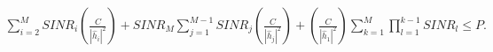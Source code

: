 \documentclass[preview]{standalone}
\begin{document}
\begin{align*}
\sum_{i=2}^{M} SINR_i \left( \frac{C}{\left|{\hat{h}_i}\right|^2} \right) + SINR_M \sum_{j=1}^{M-1} SINR_j \left( \frac{C}{\left|{\hat{h}_j}\right|^2} \right) + \left( \frac{C}{\left|{\hat{h}_1}\right|^2} \right) \sum_{k=1}^{M} \prod_{l=1}^{k-1} SINR_l \leq P.
\end{align*}
\end{document}
